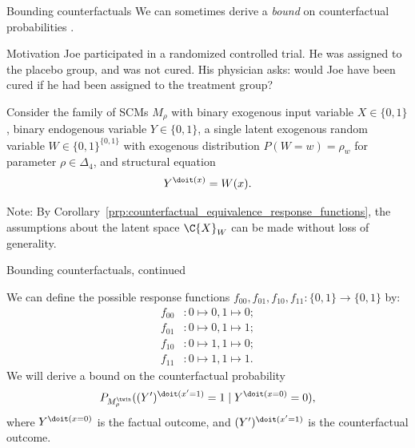 \begin{frame}{Bounding counterfactuals}
  We can sometimes derive a \emph{bound} on counterfactual probabilities \cite{BalkePearl1994b}.

  \begin{block}{Motivation}
    Joe participated in a randomized controlled trial. He was assigned to the placebo group, and was not cured.
    His physician asks: would Joe have been cured if he had been assigned to the treatment group?
  \end{block}

  \begin{Eg}[\ref{ex:Bounding_counterfactuals}]
    Consider the family of SCMs $M_\rho$ with binary exogenous input variable $X \in \{0,1\}$, binary endogenous variable $Y \in \{0,1\}$, a single latent exogenous random variable $W \in \{0,1\}^{\{0,1\}}$ with exogenous distribution $P(W=w) = \rho_w$
  for parameter $\rho \in \Delta_4$, and structural equation $$Y^{\doit(x)} = W(x).$$
  \end{Eg}

  Note: By Corollary~\ref{prp:counterfactual_equivalence_response_functions}, the assumptions about the latent
  space $\C{X}_W$ can be made without loss of generality.
\end{frame}

\begin{frame}{Bounding counterfactuals, continued}
  \begin{Eg}
  We can define the possible response functions $f_{00},f_{01},f_{10},f_{11} : \{0,1\} \to \{0,1\}$ by:
  \begin{align*}
    f_{00} &: 0 \mapsto 0, 1 \mapsto 0;\\
    f_{01} &: 0 \mapsto 0, 1 \mapsto 1;\\
    f_{10} &: 0 \mapsto 1, 1 \mapsto 0;\\
    f_{11} &: 0 \mapsto 1, 1 \mapsto 1.
  \end{align*}
  We will derive a bound on the counterfactual probability
    $$P_{M_{\rho}^{\twin}}((Y')^{\doit(x'=1)}=1\mid Y^{\doit(x=0)}=0),$$
  where $Y^{\doit(x=0)}$ is the factual outcome, and $(Y')^{\doit(x'=1)}$ is the counterfactual outcome.
  \end{Eg}
\end{frame}

